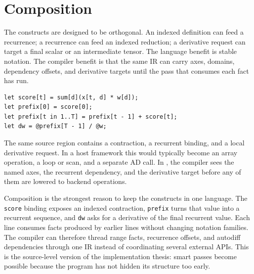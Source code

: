 \section{Composition}

The constructs are designed to be orthogonal. An indexed definition can feed a
recurrence; a recurrence can feed an indexed reduction; a derivative request can
target a final scalar or an intermediate tensor. The language benefit is stable
notation. The compiler benefit is that the same IR can carry axes, domains,
dependency offsets, and derivative targets until the pass that consumes each
fact has run.

\begin{lstlisting}[style=einlang]
let score[t] = sum[d](x[t, d] * w[d]);
let prefix[0] = score[0];
let prefix[t in 1..T] = prefix[t - 1] + score[t];
let dw = @prefix[T - 1] / @w;
\end{lstlisting}

The same source region contains a contraction, a recurrent binding, and a local
derivative request. In a host framework this would typically become an array
operation, a loop or scan, and a separate AD call. In \einlang{}, the compiler
sees the named axes, the recurrent dependency, and the derivative target before
any of them are lowered to backend operations.

Composition is the strongest reason to keep the constructs in one language.
The \texttt{score} binding exposes an indexed contraction, \texttt{prefix}
turns that value into a recurrent sequence, and \texttt{dw} asks for a
derivative of the final recurrent value. Each line consumes facts produced by
earlier lines without changing notation families. The compiler can therefore
thread range facts, recurrence offsets, and autodiff dependencies through one
IR instead of coordinating several external APIs. This is the source-level
version of the implementation thesis: smart passes become possible because the
program has not hidden its structure too early.
